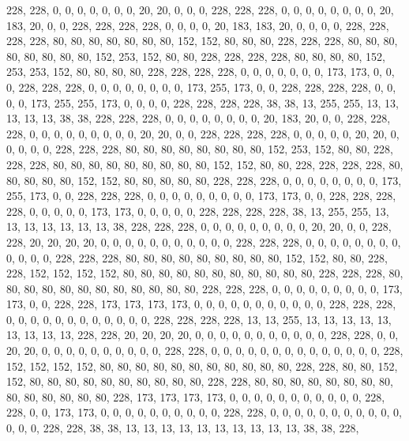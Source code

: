 {	228, 228, 0,   0,   0,   0,   0,   0,   0,   20,  20,  0,   0,   0,   228, 228, 228, 0,   0,   0,   0,   0,   0,   0,   0,   20,  183, 20,  0,   0,   228, 228, 228, 228, 0,   0,   0,   0,   20,  183, 183, 20,  0,   0,   0,   0,   228, 228, 228, 228, 80,  80,  80,  80,  80,  80,  80,  152, 152, 80,  80,  80,  228, 228, 228, 80,  80,  80,  80,  80,  80,  80,  80,  152, 253, 152, 80,  80,  228, 228, 228, 228, 80,  80,  80,  80,  152, 253, 253, 152, 80,  80,  80,  80,  228, 228, 228, 228, 0,   0,   0,   0,   0,   0,   0,   173, 173, 0,   0,   0,   228, 228, 228, 0,   0,   0,   0,   0,   0,   0,   0,   173, 255, 173, 0,   0,   228, 228, 228, 228, 0,   0,   0,   0,   173, 255, 255, 173, 0,   0,   0,   0,   228, 228, 228, 228, 38,  38,  13,  255, 255, 13,  13,  13,  13,  13,  38,  38,  228, 228, 
	228, 0,   0,   0,   0,   0,   0,   0,   0,   20,  183, 20,  0,   0,   228, 228, 228, 0,   0,   0,   0,   0,   0,   0,   0,   0,   20,  20,  0,   0,   228, 228, 228, 228, 0,   0,   0,   0,   0,   20,  20,  0,   0,   0,   0,   0,   228, 228, 228, 80,  80,  80,  80,  80,  80,  80,  80,  152, 253, 152, 80,  80,  228, 228, 228, 80,  80,  80,  80,  80,  80,  80,  80,  80,  152, 152, 80,  80,  228, 228, 228, 228, 80,  80,  80,  80,  80,  152, 152, 80,  80,  80,  80,  80,  228, 228, 228, 0,   0,   0,   0,   0,   0,   0,   0,   173, 255, 173, 0,   0,   228, 228, 228, 0,   0,   0,   0,   0,   0,   0,   0,   0,   173, 173, 0,   0,   228, 228, 228, 228, 0,   0,   0,   0,   0,   173, 173, 0,   0,   0,   0,   0,   228, 228, 228, 228, 38,  13,  255, 255, 13,  13,  13,  13,  13,  13,  13,  38,  228, 228, 
	228, 0,   0,   0,   0,   0,   0,   0,   0,   0,   20,  20,  0,   0,   228, 228, 20,  20,  20,  20,  0,   0,   0,   0,   0,   0,   0,   0,   0,   0,   0,   228, 228, 228, 0,   0,   0,   0,   0,   0,   0,   0,   0,   0,   0,   0,   228, 228, 228, 80,  80,  80,  80,  80,  80,  80,  80,  80,  152, 152, 80,  80,  228, 228, 152, 152, 152, 152, 80,  80,  80,  80,  80,  80,  80,  80,  80,  80,  80,  228, 228, 228, 80,  80,  80,  80,  80,  80,  80,  80,  80,  80,  80,  80,  228, 228, 228, 0,   0,   0,   0,   0,   0,   0,   0,   0,   173, 173, 0,   0,   228, 228, 173, 173, 173, 173, 0,   0,   0,   0,   0,   0,   0,   0,   0,   0,   0,   228, 228, 228, 0,   0,   0,   0,   0,   0,   0,   0,   0,   0,   0,   0,   228, 228, 228, 228, 13,  13,  255, 13,  13,  13,  13,  13,  13,  13,  13,  13,  228, 228, 
	20,  20,  20,  20,  0,   0,   0,   0,   0,   0,   0,   0,   0,   0,   0,   228, 228, 0,   0,   20,  20,  0,   0,   0,   0,   0,   0,   0,   0,   0,   0,   228, 228, 0,   0,   0,   0,   0,   0,   0,   0,   0,   0,   0,   0,   0,   0,   228, 152, 152, 152, 152, 80,  80,  80,  80,  80,  80,  80,  80,  80,  80,  80,  228, 228, 80,  80,  152, 152, 80,  80,  80,  80,  80,  80,  80,  80,  80,  80,  228, 228, 80,  80,  80,  80,  80,  80,  80,  80,  80,  80,  80,  80,  80,  80,  228, 173, 173, 173, 173, 0,   0,   0,   0,   0,   0,   0,   0,   0,   0,   0,   228, 228, 0,   0,   173, 173, 0,   0,   0,   0,   0,   0,   0,   0,   0,   0,   228, 228, 0,   0,   0,   0,   0,   0,   0,   0,   0,   0,   0,   0,   0,   0,   228, 228, 38,  38,  13,  13,  13,  13,  13,  13,  13,  13,  13,  13,  38,  38,  228, 
}
